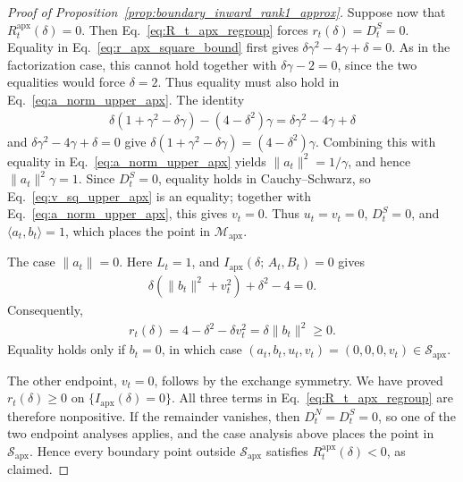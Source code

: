 \documentclass[10pt,a4paper]{amsart}
\newcommand{\apx}{\mathrm{apx}}
\newcommand{\iapx}{I_{\mathrm{apx}}}
\providecommand{\paragraph}{}
\begin{document}
\begin{proof}[Proof of Proposition~\ref{prop:boundary_inward_rank1_approx}]
Suppose now that $R_t^\apx(\delta)=0$. Then
Eq.~\eqref{eq:R_t_apx_regroup} forces $r_t(\delta)=D_t^S=0$.
Equality in Eq.~\eqref{eq:r_apx_square_bound} first gives
$\delta\gamma^2-4\gamma+\delta=0$. As in the factorization case, this cannot
hold together with $\delta\gamma-2=0$, since the two equalities would force
$\delta=2$. Thus equality must also hold in Eq.~\eqref{eq:a_norm_upper_apx}.
The identity
\begin{align}
    \delta(1+\gamma^2-\delta\gamma)
    -(4-\delta^2)\gamma
    =\delta\gamma^2-4\gamma+\delta
\end{align}
and $\delta\gamma^2-4\gamma+\delta=0$ give
$\delta(1+\gamma^2-\delta\gamma)=(4-\delta^2)\gamma$. Combining this with
equality in Eq.~\eqref{eq:a_norm_upper_apx} yields
$\|a_t\|^2=1/\gamma$, and hence $\|a_t\|^2\gamma=1$. Since $D_t^S=0$,
equality holds in Cauchy--Schwarz, so Eq.~\eqref{eq:v_sq_upper_apx} is an
equality; together with
Eq.~\eqref{eq:a_norm_upper_apx}, this gives $v_t=0$. Thus $u_t=v_t=0$,
$D_t^S=0$, and $\langle a_t,b_t\rangle=1$, which places the point in
$\mathcal M_\apx$.

\paragraph{The case $\|a_t\|=0$.}
Here $L_t=1$, and $\iapx(\delta;\,A_t,B_t)=0$ gives
\begin{align}
    \delta(\|b_t\|^2+v_t^2)+\delta^2-4=0.
\end{align}
Consequently,
\begin{align}
    r_t(\delta)
    =4-\delta^2-\delta v_t^2
    =\delta\|b_t\|^2\ge0.
\end{align}
Equality holds only if $b_t=0$, in which case
$(a_t,b_t,u_t,v_t)=(0,0,0,v_t)\in\mathcal S_\apx$.

The other endpoint, $v_t=0$, follows by the exchange symmetry. We have proved
$r_t(\delta)\ge0$ on $\{\iapx(\delta)=0\}$. All three terms in
Eq.~\eqref{eq:R_t_apx_regroup} are therefore nonpositive. If the remainder
vanishes, then $D_t^N=D_t^S=0$, so one of the two endpoint analyses applies,
and the case analysis above places the point in $\mathcal S_\apx$. Hence every
boundary point outside $\mathcal S_\apx$ satisfies $R_t^\apx(\delta)<0$, as claimed.
\end{proof}
\end{document}
